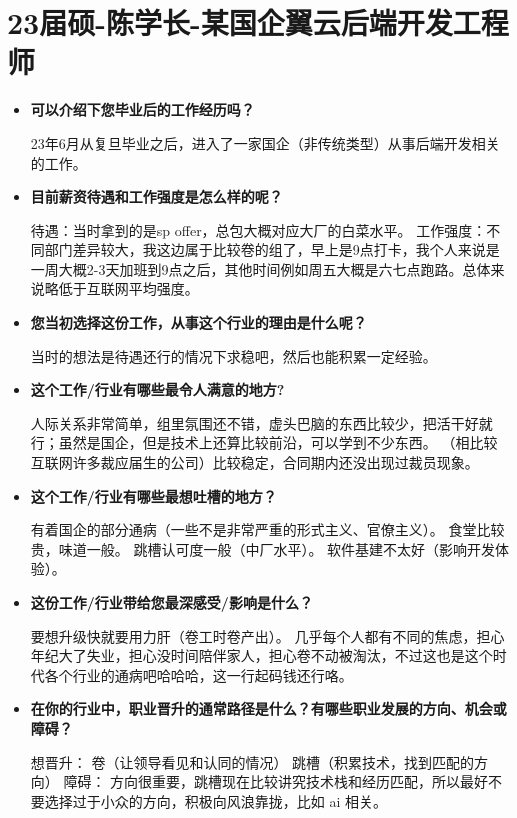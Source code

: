 \newpage
\section{23届硕-陈学长-某国企翼云后端开发工程师}
\begin{itemize}

\setlength{\parindent}{2em} 
    \item \textbf{可以介绍下您毕业后的工作经历吗？}

23年6月从复旦毕业之后，进入了一家国企（非传统类型）从事后端开发相关的工作。

    \item \textbf{目前薪资待遇和工作强度是怎么样的呢？}

待遇：当时拿到的是sp offer，总包大概对应大厂的白菜水平。
工作强度：不同部门差异较大，我这边属于比较卷的组了，早上是9点打卡，我个人来说是一周大概2-3天加班到9点之后，其他时间例如周五大概是六七点跑路。总体来说略低于互联网平均强度。


    \item \textbf{您当初选择这份工作，从事这个行业的理由是什么呢？}

当时的想法是待遇还行的情况下求稳吧，然后也能积累一定经验。

  
    \item \textbf{这个工作/行业有哪些最令人满意的地方?}

人际关系非常简单，组里氛围还不错，虚头巴脑的东西比较少，把活干好就行；虽然是国企，但是技术上还算比较前沿，可以学到不少东西。
（相比较互联网许多裁应届生的公司）比较稳定，合同期内还没出现过裁员现象。


    \item \textbf{这个工作/行业有哪些最想吐槽的地方？}

有着国企的部分通病（一些不是非常严重的形式主义、官僚主义）。
食堂比较贵，味道一般。
跳槽认可度一般（中厂水平）。
软件基建不太好（影响开发体验）。

    \item \textbf{这份工作/行业带给您最深感受/影响是什么？}

要想升级快就要用力肝（卷工时卷产出）。
几乎每个人都有不同的焦虑，担心年纪大了失业，担心没时间陪伴家人，担心卷不动被淘汰，不过这也是这个时代各个行业的通病吧哈哈哈，这一行起码钱还行咯。

    \item \textbf{在你的行业中，职业晋升的通常路径是什么？有哪些职业发展的方向、机会或障碍？}

想晋升：
卷（让领导看见和认同的情况）
跳槽（积累技术，找到匹配的方向）
障碍：
方向很重要，跳槽现在比较讲究技术栈和经历匹配，所以最好不要选择过于小众的方向，积极向风浪靠拢，比如 ai 相关。


\end{itemize}
